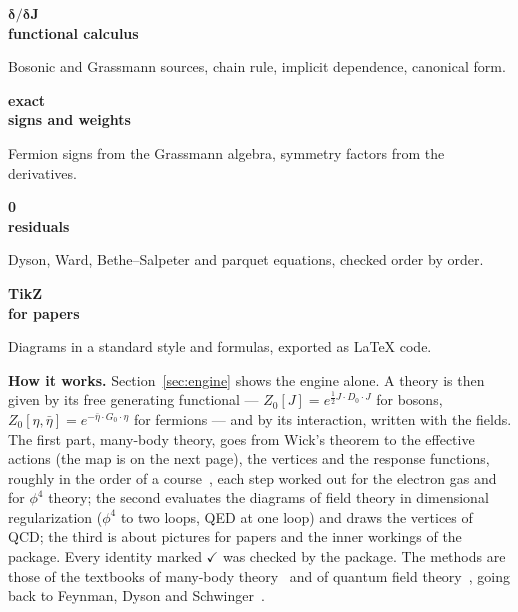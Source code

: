 \documentclass[11pt,a4paper]{article}
\newcommand{\tile}[3]{\begin{tcolorbox}[colback=accentpale, colframe=accentpale, arc=3pt, left=7pt, right=7pt, top=5pt,
  bottom=5pt, equal height group=tiles, valign=top]
  \raggedright{\sffamily\bfseries\Large\color{accent}#1}\\[1pt]{\sffamily\bfseries\small #2}\\[2pt]{\small #3\par}\end{tcolorbox}}
\newcommand{\ok}{\textcolor{checkgreen}{\ensuremath{\checkmark}}}
\begin{document}
\medskip
\noindent
\begin{minipage}[t]{0.235\textwidth}\tile{$\boldsymbol{\delta/\delta J}$}{functional calculus}{Bosonic and Grassmann
sources, chain rule, implicit dependence, canonical form.}\end{minipage}\hfill
\begin{minipage}[t]{0.235\textwidth}\tile{exact}{signs and weights}{Fermion signs from the Grassmann algebra, symmetry
factors from the derivatives.}\end{minipage}\hfill
\begin{minipage}[t]{0.235\textwidth}\tile{0}{residuals}{Dyson, Ward, Bethe--Salpeter and parquet equations, checked order
by order.}\end{minipage}\hfill
\begin{minipage}[t]{0.235\textwidth}\tile{TikZ}{for papers}{Diagrams in a standard style and formulas, exported as
\LaTeX{} code.}\end{minipage}

\smallskip
\noindent\textbf{How it works.} Section~\ref{sec:engine} shows the engine alone. A theory is then given by its free
generating functional --- $Z_0[J]=e^{\frac12 J\cdot D_0\cdot J}$ for bosons, $Z_0[\eta,\bar\eta]=e^{-\bar\eta\cdot G_0\cdot\eta}$ for
fermions --- and by its interaction, written with the fields. The first part, many-body theory, goes from Wick's
theorem to the effective actions (the map is on the next page), the vertices and the response functions, roughly in the
order of a course~\cite{Fabrizio2022}, each step worked out for the electron gas and for $\phi^4$ theory; the second
evaluates the diagrams of field theory in dimensional regularization ($\phi^4$ to two loops, QED at one loop) and draws
the vertices of QCD; the third is about pictures for papers and the inner workings of the package. Every identity marked
\ok{} was checked by the package. The methods are those of the textbooks of many-body
theory~\cite{AbrikosovGorkovDzyaloshinski,FetterWalecka,NegeleOrland,Mahan,BruusFlensberg,GiulianiVignale,AltlandSimons,Coleman2015,Fabrizio2022}
and of quantum field theory~\cite{ItzyksonZuber,PeskinSchroeder,ZinnJustin2002,Weinberg1996,Vasilev1998}, going back to
Feynman, Dyson and Schwinger~\cite{Feynman1949,Dyson1949a,Dyson1949b,Schwinger1951}.
\end{document}

